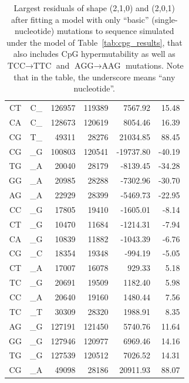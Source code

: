 \documentclass{article}
\newcommand{\nA}{\mbox{A}}  %
\newcommand{\nC}{\mbox{C}}
\newcommand{\nG}{\mbox{G}}
\newcommand{\nT}{\mbox{T}}
\theoremstyle{plain}
\theoremstyle{definition}
\begin{document}
\begin{table}
\begin{center}
\begin{tabular}{ccrrrr}
                \nC\nT  & \nC\_   & 126957   &  119389    &   7567.92   & 15.48   \\
                \nC\nA  & \nC\_   & 128673   &  120619    &   8054.46   & 16.39   \\
                \nC\nG  & \nT\_   &  49311   &   28276    &  21034.85   & 88.45   \\
                \hline
                \hline
                \nC\nG  &  \_\nG  &  100803  &  120541  &  -19737.80  &  -40.19 \\
                \nT\nG  &  \_\nA  &   20040  &   28179  &   -8139.45  &  -34.28 \\
                \nG\nG  &  \_\nA  &   20985  &   28288  &   -7302.96  &  -30.70 \\
                \nA\nG  &  \_\nA  &   22929  &   28399  &   -5469.73  &  -22.95 \\
                \nC\nC  &  \_\nG  &   17805  &   19410  &   -1605.01  &   -8.14 \\
                \nC\nT  &  \_\nG  &   10470  &   11684  &   -1214.31  &   -7.94 \\
                \nC\nA  &  \_\nG  &   10839  &   11882  &   -1043.39  &   -6.76 \\
                \nC\nG  &  \_\nC  &   18354  &   19348  &    -994.19  &   -5.05 \\
                \hline
                \nC\nT  &  \_\nA  &   17007  &   16078  &     929.33  &    5.18 \\
                \nT\nC  &  \_\nG  &   20691  &   19509  &    1182.40  &    5.98 \\
                \nC\nC  &  \_\nA  &   20640  &   19160  &    1480.44  &    7.56 \\
                \nT\nC  &  \_\nT  &   30309  &   28320  &    1988.91  &    8.35 \\
                \nA\nG  &  \_\nG  &  127191  &  121450  &    5740.76  &   11.64 \\
                \nG\nG  &  \_\nG  &  127946  &  120977  &    6969.46  &   14.16 \\
                \nT\nG  &  \_\nG  &  127539  &  120512  &    7026.52  &   14.31 \\
                \nC\nG  &  \_\nA  &   49098  &   28186  &   20911.93  &   88.07 \\
                \hline
        \end{tabular}
    \end{center}
    \caption{
        Largest residuals of shape (2,1,0) and (2,0,1) after fitting a model with only ``basic''
        (single-nucleotide) mutations to sequence simulated under the model
        of Table~\ref{tab:cpg_results}, that also includes CpG hypermutability
        as well as $\nT\nC\nC \to \nT\nT\nC$ and $\nA\nG\nG \to \nA\nA\nG$ mutations.
        Note that in the table, the underscore means ``any nucleotide''.
        \label{tab:resid1}
    }
\end{table}
\end{document}
